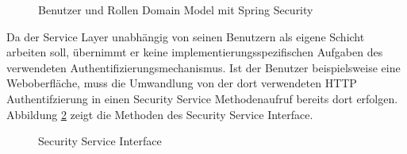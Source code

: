 \begin{figure}[bth]
	\caption{Benutzer und Rollen Domain Model mit Spring Security}
	\label{ill:securitymodel}
\end{figure}

Da der Service Layer unabhängig von seinen Benutzern als eigene Schicht arbeiten
soll, übernimmt er keine implementierungsspezifischen Aufgaben des verwendeten
Authentifizierungsmechanismus. Ist der Benutzer beispielsweise eine
Weboberfläche, muss die Umwandlung von der dort verwendeten \ac{HTTP} Authentifzierung in einen
Security Service Methodenaufruf bereits dort erfolgen. Abbildung
\ref{ill:securityservice} zeigt die Methoden des Security Service Interface.

\begin{figure}[bth]
	\caption{Security Service Interface}
	\label{ill:securityservice}
\end{figure}

